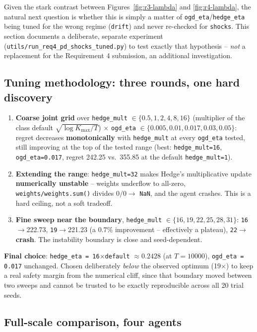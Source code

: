 \documentclass[11pt,a4paper]{article}
\newcommand{\1}{\mathbf{1}}
\begin{document}
Given the stark contrast between Figures~\ref{fig:r3-lambda} and \ref{fig:r4-lambda}, the natural next question is whether this is simply a matter of \texttt{ogd\_eta}/\texttt{hedge\_eta} being tuned for the wrong regime (\texttt{drift}) and never re-checked for \texttt{shocks}. This section documents a deliberate, separate experiment (\texttt{utils/run\_req4\_pd\_shocks\_tuned.py}) to test exactly that hypothesis -- \emph{not} a replacement for the Requirement 4 submission, an additional investigation.

\subsection{Tuning methodology: three rounds, one hard discovery}

\begin{enumerate}[leftmargin=1.4em]
  \item \textbf{Coarse joint grid} over \texttt{hedge\_mult} $\in \{0.5,1,2,4,8,16\}$ (multiplier of the class default $\sqrt{\log K_{\max}/T}$) $\times$ \texttt{ogd\_eta} $\in \{0.005,0.01,0.017,0.03,0.05\}$: regret decreases \textbf{monotonically} with \texttt{hedge\_mult} at every \texttt{ogd\_eta} tested, still improving at the top of the tested range (best: \texttt{hedge\_mult=16}, \texttt{ogd\_eta=0.017}, regret 242.25 vs.\ 355.85 at the default \texttt{hedge\_mult=1}).
  \item \textbf{Extending the range}: \texttt{hedge\_mult=32} makes Hedge's multiplicative update \textbf{numerically unstable} -- weights underflow to all-zero, \texttt{weights/weights.sum()} divides $0/0 \to$ \texttt{NaN}, and the agent crashes. This is a hard ceiling, not a soft tradeoff.
  \item \textbf{Fine sweep near the boundary}, \texttt{hedge\_mult} $\in \{16,19,22,25,28,31\}$: \texttt{16}$\to$222.73, \texttt{19}$\to$221.23 (a $0.7\%$ improvement -- effectively a plateau), \texttt{22}$\to$\textbf{crash}. The instability boundary is close and seed-dependent.
\end{enumerate}

\textbf{Final choice}: \texttt{hedge\_eta = 16}$\times$\texttt{default} $\approx 0.2428$ (at $T=10000$), \texttt{ogd\_eta = 0.017} unchanged. Chosen deliberately \emph{below} the observed optimum (19$\times$) to keep a real safety margin from the numerical cliff, since that boundary moved between two sweeps and cannot be trusted to be exactly reproducible across all 20 trial seeds.

\subsection{Full-scale comparison, four agents}
\end{document}
